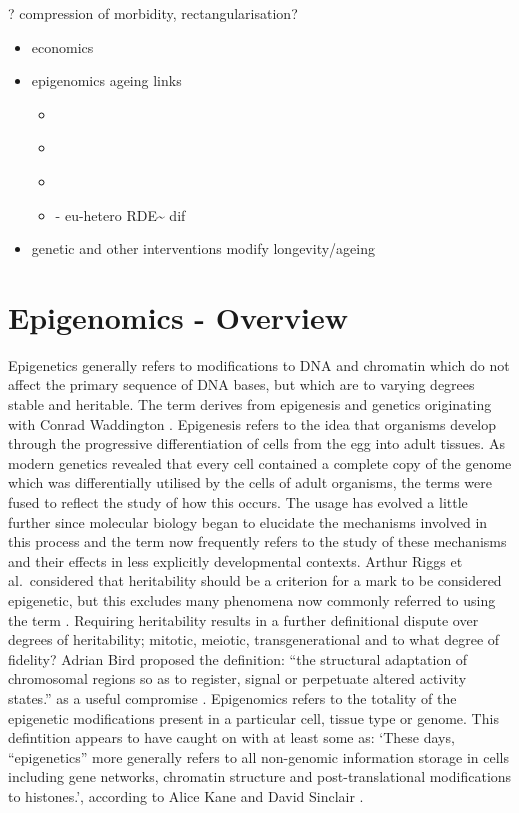 \documentclass[
]{book}
\providecommand{\tightlist}{%
  \setlength{\itemsep}{0pt}\setlength{\parskip}{0pt}}
\begin{document}
? compression of morbidity, rectangularisation?

\begin{itemize}
\item
  economics \citep{Goldman2016}
\item
  epigenomics ageing links

  \begin{itemize}
  \tightlist
  \item
    \citet{Sinclair2009}
  \item
    \citet{Kane2019}
  \item
    \citet{Hayano2019}
  \item
    \citet{Jenkinson2017} - eu-hetero RDE\textasciitilde{} dif
  \end{itemize}
\item
  genetic and other interventions modify longevity/ageing
\end{itemize}

\hypertarget{epigenomics---overview}{%
\section{Epigenomics - Overview}\label{epigenomics---overview}}

Epigenetics generally refers to modifications to DNA and chromatin which do not affect the primary sequence of DNA bases, but which are to varying degrees stable and heritable. The term derives from epigenesis and genetics originating with Conrad Waddington \citep{Waddington1942}. Epigenesis refers to the idea that organisms develop through the progressive differentiation of cells from the egg into adult tissues. As modern genetics revealed that every cell contained a complete copy of the genome which was differentially utilised by the cells of adult organisms, the terms were fused to reflect the study of how this occurs. The usage has evolved a little further since molecular biology began to elucidate the mechanisms involved in this process and the term now frequently refers to the study of these mechanisms and their effects in less explicitly developmental contexts. Arthur Riggs et al.~considered that heritability should be a criterion for a mark to be considered epigenetic, but this excludes many phenomena now commonly referred to using the term \citep{Russo1996}. Requiring heritability results in a further definitional dispute over degrees of heritability; mitotic, meiotic, transgenerational and to what degree of fidelity? Adrian Bird proposed the definition: ``the structural adaptation of chromosomal regions so as to register, signal or perpetuate altered activity states.'' as a useful compromise \citep{Bird2007}. Epigenomics refers to the totality of the epigenetic modifications present in a particular cell, tissue type or genome. This defintition appears to have caught on with at least some as: `These days, ``epigenetics'' more generally refers to all non-genomic information storage in cells including gene networks, chromatin structure and post-translational modifications to histones.', according to Alice Kane and David Sinclair \citep{Kane2019}.
\end{document}

